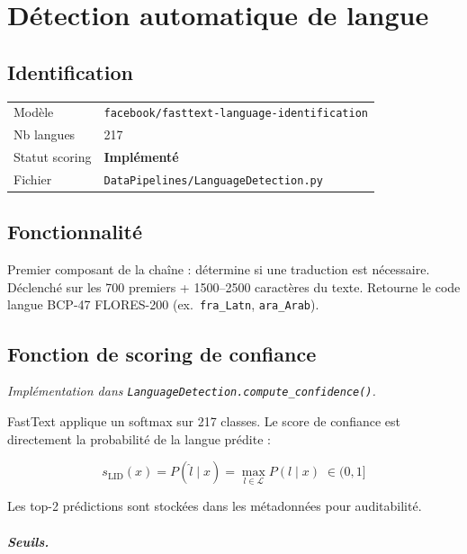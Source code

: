 \chapter{Détection automatique de langue}

\section{Identification}

\begin{center}
\begin{tabular}{ll}
\toprule
Modèle         & \texttt{facebook/fasttext-language-identification} \\
Nb langues     & 217 \\
Statut scoring & \textbf{Implémenté} \\
Fichier        & \texttt{DataPipelines/LanguageDetection.py} \\
\bottomrule
\end{tabular}
\end{center}

\section{Fonctionnalité}

Premier composant de la chaîne : détermine si une traduction est nécessaire.
Déclenché sur les 700 premiers + 1500--2500 caractères du texte. Retourne le
code langue BCP-47 FLORES-200 (ex.\ \texttt{fra\_Latn}, \texttt{ara\_Arab}).

\section{Fonction de scoring de confiance}

\noindent\textit{Implémentation dans
\texttt{LanguageDetection.compute\_confidence()}.}

\medskip
FastText applique un softmax sur 217 classes. Le score de confiance est
directement la probabilité de la langue prédite :

\begin{equation}
  s_{\text{LID}}(x)
  = P(\hat{l} \mid x)
  = \max_{l \in \mathcal{L}} P(l \mid x)
  \;\in (0, 1]
  \label{eq:lid}
\end{equation}

Les top-2 prédictions sont stockées dans les métadonnées pour auditabilité.

\paragraph{Seuils.}

